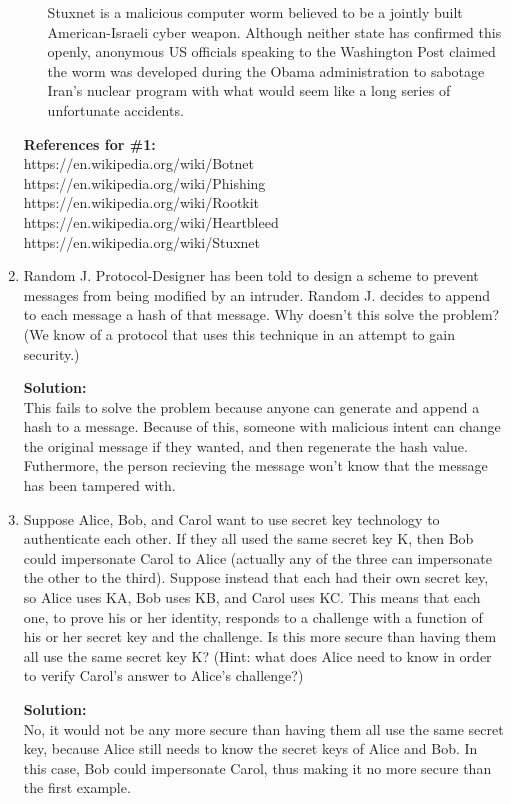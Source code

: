 \documentclass[11pt]{article}
\begin{document}
\begin{enumerate}[1)]
\begin{itemize}
Stuxnet is a malicious computer worm believed to be a jointly built American-Israeli cyber weapon. Although neither state has confirmed this openly, anonymous US officials speaking to the Washington Post claimed the worm was developed during the Obama administration to sabotage Iran’s nuclear program with what would seem like a long series of unfortunate accidents.
\end{itemize}

\textbf{References for \#1:} \\
https://en.wikipedia.org/wiki/Botnet \\
https://en.wikipedia.org/wiki/Phishing \\
https://en.wikipedia.org/wiki/Rootkit \\
https://en.wikipedia.org/wiki/Heartbleed \\
https://en.wikipedia.org/wiki/Stuxnet 

\newpage

\item Random J. Protocol-Designer has been told to design a scheme to prevent messages from being modified by an intruder. Random J. decides to append to each message a hash of that message. Why doesn't this solve the problem? (We know of a protocol that uses this technique in an attempt to gain security.)

\textbf{Solution: } \\
This fails to solve the problem because anyone can generate and append a hash to a message.  Because of this, someone with malicious intent can change the original message if they wanted, and then regenerate the hash value.  Futhermore, the person recieving the message won't know that the message has been tampered with.  

\item Suppose Alice, Bob, and Carol want to use secret key technology to authenticate each other. If they all used the same secret key K, then Bob could impersonate Carol to Alice (actually any of the three can impersonate the other to the third). Suppose instead that each had their own secret key, so Alice uses KA, Bob uses KB, and Carol uses KC. This means that each one, to prove his or her identity, responds to a challenge with a function of his or her secret key and the challenge. Is this more secure than having them all use the same secret key K? (Hint: what does Alice need to know in order to verify Carol's answer to Alice's challenge?)

\textbf{Solution: } \\
No, it would not be any more secure than having them all use the same secret key, because Alice still needs to know the secret keys of Alice and Bob.  In this case, Bob could impersonate Carol, thus making it no more secure than the first example.  


\end{enumerate}
\end{document}
